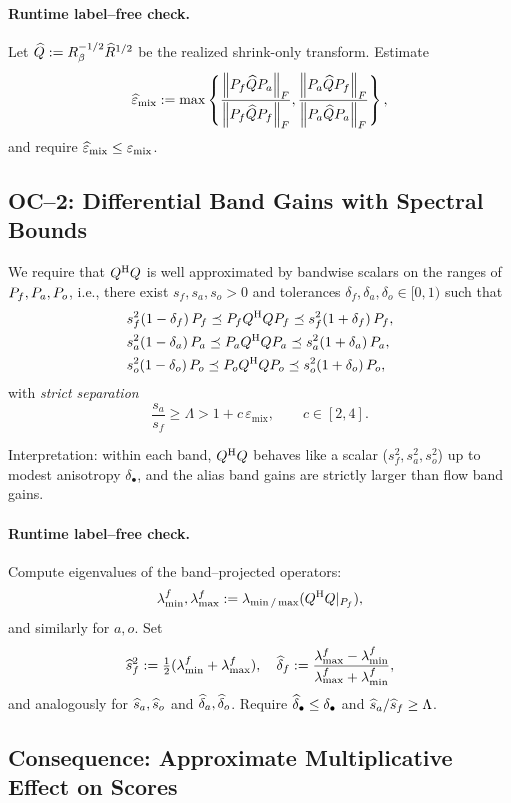 \paragraph{Runtime label--free check.}
Let $\widehat Q := R_\beta^{-1/2}\widehat R^{1/2}$ be the realized shrink-only transform. Estimate
\[
\widehat\varepsilon_{\text{mix}} :=
\max\left\{ 
  \frac{\left\lVert P_f \widehat Q P_a \right\rVert_F}{\left\lVert P_f \widehat Q P_f \right\rVert_F},
  \frac{\left\lVert P_a \widehat Q P_f \right\rVert_F}{\left\lVert P_a \widehat Q P_a \right\rVert_F}
\right\},
\]
and require $\widehat\varepsilon_{\text{mix}} \le \varepsilon_{\text{mix}}$.

\subsection{OC--2: Differential Band Gains with Spectral Bounds}

We require that $Q^{\mathrm{H}} Q$ is well approximated by bandwise scalars on the ranges of $P_f,P_a,P_o$, i.e., there exist $s_f,s_a,s_o>0$ and tolerances $\delta_f,\delta_a,\delta_o\in[0,1)$ such that
\begin{align*}
  &s_f^2(1-\delta_f)\,P_f \preceq P_f Q^{\mathrm{H}} Q P_f \preceq s_f^2(1+\delta_f)\,P_f,\\
  &s_a^2(1-\delta_a)\,P_a \preceq P_a Q^{\mathrm{H}} Q P_a \preceq s_a^2(1+\delta_a)\,P_a,\\
  &s_o^2(1-\delta_o)\,P_o \preceq P_o Q^{\mathrm{H}} Q P_o \preceq s_o^2(1+\delta_o)\,P_o,
\end{align*}
with \emph{strict separation}
\[
\frac{s_a}{s_f} \ge \Lambda > 1 + c\,\varepsilon_{\text{mix}},\qquad c\in[2,4].
\]

Interpretation: within each band, $Q^{\mathrm{H}} Q$ behaves like a scalar ($s_f^2,s_a^2,s_o^2$) up to modest anisotropy $\delta_\bullet$, and the alias band gains are strictly larger than flow band gains.

\paragraph{Runtime label--free check.}
Compute eigenvalues of the band--projected operators:
\[
\lambda_{\min}^f,\lambda_{\max}^f := \lambda_{\min/\max}(Q^{\mathrm{H}} Q|_{P_f}),
\]
and similarly for $a,o$. Set
\[
\widehat s_f^2 := \tfrac12(\lambda_{\min}^f + \lambda_{\max}^f),\quad
\widehat\delta_f := \frac{\lambda_{\max}^f - \lambda_{\min}^f}{\lambda_{\max}^f + \lambda_{\min}^f},
\]
and analogously for $\widehat s_a,\widehat s_o$ and $\widehat\delta_a,\widehat\delta_o$. Require $\widehat\delta_\bullet\le\delta_\bullet$ and $\widehat s_a/\widehat s_f \ge \Lambda$.

\subsection{Consequence: Approximate Multiplicative Effect on Scores}

